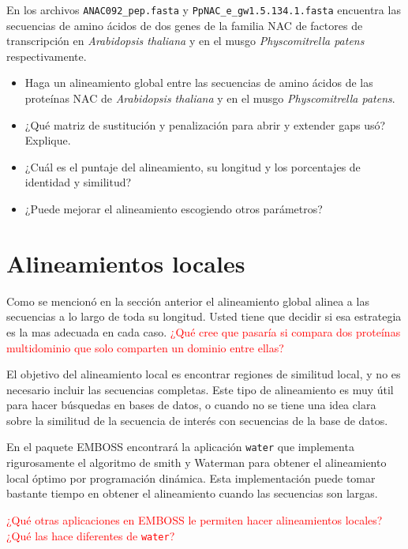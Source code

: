 \documentclass[letter,11pt]{book}
\begin{document}
En los archivos \Verb+ANAC092_pep.fasta+ y \Verb+PpNAC_e_gw1.5.134.1.fasta+ encuentra las secuencias de amino ácidos de dos genes de la familia NAC de factores de transcripción en \textit{Arabidopsis thaliana} y en el musgo \textit{Physcomitrella patens} respectivamente.

{\color{red}
\begin{itemize}
\item Haga un alineamiento global entre las secuencias de amino ácidos de las proteínas NAC de \textit{Arabidopsis thaliana} y en el musgo \textit{Physcomitrella patens}.
\item ¿Qué matriz de sustitución y penalización para abrir y extender gaps usó? Explique.
\item ¿Cuál es el puntaje del alineamiento, su longitud y los porcentajes de identidad y similitud?
\item ¿Puede mejorar el alineamiento escogiendo otros parámetros?
\end{itemize}
}

\section{Alineamientos locales}

Como se mencionó en la sección anterior el alineamiento global alinea a las secuencias a lo largo de toda su longitud. Usted tiene que decidir si esa estrategia es la mas adecuada en cada caso. \textcolor{red}{¿Qué cree que pasaría si compara dos proteínas multidominio que solo comparten un dominio entre ellas?}

El objetivo del alineamiento local es encontrar regiones de similitud local, y no es necesario incluir las secuencias completas. Este tipo de alineamiento es muy útil para hacer búsquedas en bases de datos, o cuando no se tiene una idea clara sobre la similitud de la secuencia de interés con secuencias de la base de datos.

En el paquete EMBOSS encontrará la aplicación \Verb+water+ que implementa rigurosamente el algoritmo de  smith y Waterman \citep{Smith1981} para obtener el alineamiento local óptimo por programación dinámica. Esta implementación puede tomar bastante tiempo en obtener el alineamiento cuando las secuencias son largas.

\textcolor{red}{¿Qué otras aplicaciones en EMBOSS le permiten hacer alineamientos locales? ¿Qué las hace diferentes de \Verb+water+?}
\end{document}
